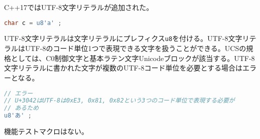 %

C++17ではUTF-8文字リテラルが追加された。

\begin{lstlisting}[language=C++]
char c = u8'a' ;
\end{lstlisting}

UTF-8文字リテラルは文字リテラルにプレフィクス\lstinline!u8!を付ける。UTF-8文字リテラルはUTF-8のコード単位1つで表現できる文字を扱うことができる。UCSの規格としては、C0制御文字と基本ラテン文字Unicodeブロックが該当する。UTF-8文字リテラルに書かれた文字が複数のUTF-8コード単位を必要とする場合はエラーとなる。

\begin{lstlisting}[language=C++]
// エラー
// U+3042はUTF-8は0xE3, 0x81, 0x82という3つのコード単位で表現する必要が
// あるため
u8'あ' ;
\end{lstlisting}

機能テストマクロはない。
